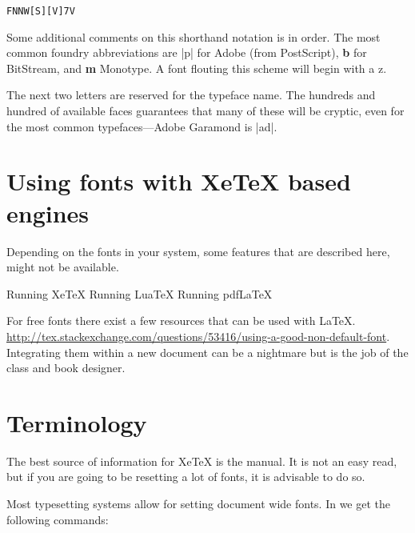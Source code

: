 \begin{verbatim}
FNNW[S][V]7V
\end{verbatim}

Some additional comments on this shorthand notation is in order. 
The most common foundry abbreviations are |p| for Adobe (from PostScript), \textbf{b} for BitStream, and \textbf{m} Monotype. A font flouting this scheme will begin with a z.

The next two letters are reserved for the typeface name. The hundreds and hundred of available faces guarantees  that many of these will be cryptic, even for the most common typefaces---Adobe Garamond is |ad|. 



\section{Using fonts with XeTeX based engines}

Depending on the fonts in your system, some features that are described here, might not be available.

\begin{texexample}{}{}
\ifxetex
  Running XeTeX
\else
  \ifluatex
    Running LuaTeX
  \else
    Running pdfLaTeX
  \fi
\fi
\end{texexample}

For free fonts there exist a few resources that can be used with \LaTeX.
\url{http://tex.stackexchange.com/questions/53416/using-a-good-non-default-font}. Integrating them within a new document can be a nightmare but is the job of the class and book designer.

\section{Terminology}

The best source of information for XeTeX is the  manual. It is not an easy read, but if you are going to be resetting a lot of fonts, it is advisable to do so.

Most typesetting systems allow for setting document wide fonts. In \latexe we get the following commands:





